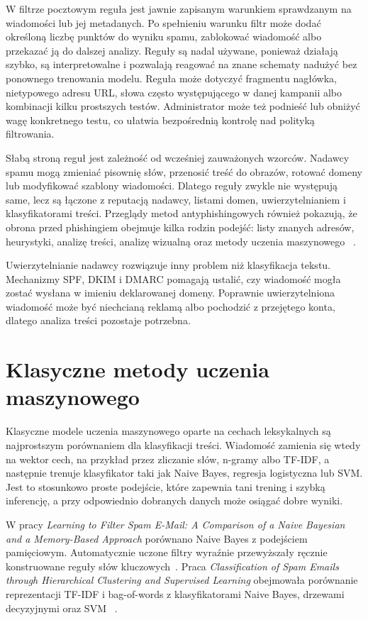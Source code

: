 W filtrze pocztowym reguła jest jawnie zapisanym warunkiem sprawdzanym na
wiadomości lub jej metadanych. Po spełnieniu warunku filtr może dodać określoną
liczbę punktów do wyniku spamu, zablokować wiadomość albo przekazać ją do dalszej
analizy. Reguły są nadal używane, ponieważ działają szybko, są interpretowalne i
pozwalają reagować na znane schematy nadużyć bez ponownego trenowania modelu.
Reguła może dotyczyć fragmentu nagłówka, nietypowego adresu URL, słowa często
występującego w danej kampanii albo kombinacji kilku prostszych testów.
Administrator może też podnieść lub obniżyć wagę konkretnego testu, co ułatwia
bezpośrednią kontrolę nad polityką filtrowania.

Słabą stroną reguł jest zależność od wcześniej zauważonych wzorców. Nadawcy
spamu mogą zmieniać pisownię słów, przenosić treść do obrazów, rotować domeny
lub modyfikować szablony wiadomości. Dlatego reguły zwykle nie występują same,
lecz są łączone z reputacją nadawcy, listami domen, uwierzytelnianiem i
klasyfikatorami treści. Przeglądy metod antyphishingowych również pokazują, że
obrona przed phishingiem obejmuje kilka rodzin podejść: listy znanych adresów,
heurystyki, analizę treści, analizę wizualną oraz metody uczenia maszynowego
~\autocite{wood-antiphishing-review-2022}.

Uwierzytelnianie nadawcy rozwiązuje inny problem niż klasyfikacja tekstu.
Mechanizmy SPF, DKIM i DMARC pomagają ustalić, czy wiadomość mogła zostać
wysłana w imieniu deklarowanej domeny. Poprawnie uwierzytelniona wiadomość może
być niechcianą reklamą albo pochodzić z przejętego konta, dlatego analiza treści
pozostaje potrzebna.

\section{Klasyczne metody uczenia maszynowego}

Klasyczne modele uczenia maszynowego oparte na cechach leksykalnych są
najprostszym porównaniem dla klasyfikacji treści. Wiadomość zamienia się wtedy
na wektor cech, na przykład przez zliczanie słów, n-gramy albo TF-IDF, a
następnie trenuje klasyfikator taki jak Naive Bayes, regresja logistyczna lub
SVM. Jest to stosunkowo proste podejście, które zapewnia tani trening i szybką
inferencję, a przy odpowiednio dobranych danych może osiągać dobre wyniki.

W pracy \emph{Learning to Filter Spam E-Mail: A Comparison of a Naive Bayesian
and a Memory-Based Approach} porównano Naive Bayes z podejściem pamięciowym.
Automatycznie uczone filtry wyraźnie przewyższały ręcznie konstruowane reguły
słów kluczowych~\autocite{androutsopoulos-naive-bayes-spam}. Praca
\emph{Classification of Spam Emails through Hierarchical Clustering and
Supervised Learning} obejmowała porównanie reprezentacji TF-IDF i bag-of-words
z klasyfikatorami Naive Bayes, drzewami decyzyjnymi oraz SVM
~\autocite{janez-martino-spam-supervised-2020}.

